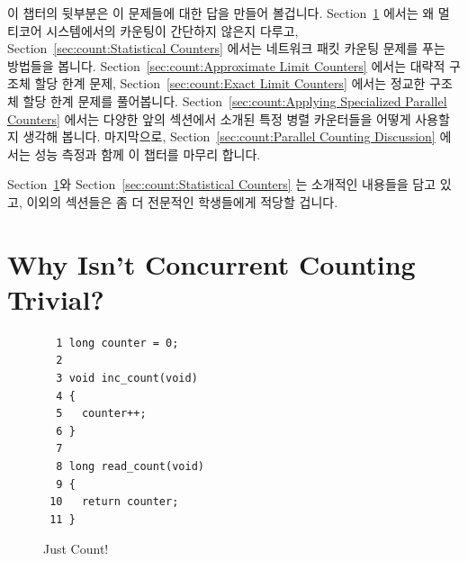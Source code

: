 \edef\QQIOcnt{Quick Quiz \thechapter.\thequickquizctr}

이 챕터의 뒷부분은 이 문제들에 대한 답을 만들어 볼겁니다.
Section~\ref{sec:count:Why Isn't Concurrent Counting Trivial?}
에서는 왜 멀티코어 시스템에서의 카운팅이 간단하지 않은지 다루고,
Section~\ref{sec:count:Statistical Counters}
에서는 네트워크 패킷 카운팅 문제를 푸는 방법들을 봅니다.
Section~\ref{sec:count:Approximate Limit Counters}
에서는 대략적 구조체 할당 한계 문제,
Section~\ref{sec:count:Exact Limit Counters}
에서는 정교한 구조체 할당 한계 문제를 풀어봅니다.
Section~\ref{sec:count:Applying Specialized Parallel Counters}
에서는 다양한 앞의 섹션에서 소개된 특정 병렬 카운터들을 어떻게 사용할지 생각해
봅니다.
마지막으로, Section~\ref{sec:count:Parallel Counting Discussion}
에서는 성능 측정과 함께 이 챕터를 마무리 합니다.

Section~\ref{sec:count:Why Isn't Concurrent Counting Trivial?}와
Section~\ref{sec:count:Statistical Counters} 는 소개적인 내용들을 담고 있고,
이외의 섹션들은 좀 더 전문적인 학생들에게 적당할 겁니다.

\section{Why Isn't Concurrent Counting Trivial?}
\label{sec:count:Why Isn't Concurrent Counting Trivial?}

\begin{figure}[bp]
{ \scriptsize
\begin{verbatim}
  1 long counter = 0;
  2 
  3 void inc_count(void)
  4 {
  5   counter++;
  6 }
  7 
  8 long read_count(void)
  9 {
 10   return counter;
 11 }
\end{verbatim}
}
\caption{Just Count!}
\label{fig:count:Just Count!}
\end{figure}

